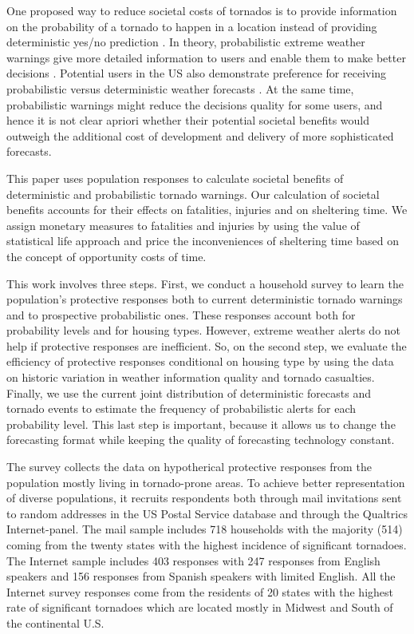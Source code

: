 \documentclass{ametsocV6.1}
\begin{document}
One proposed way to reduce societal costs of tornados is to provide information on the probability of a tornado to happen in a location instead of providing deterministic yes/no prediction \citep{rothfusz_facets_2018}. In theory, probabilistic extreme weather warnings give more detailed information to users and enable them to make better decisions \citep{murphy_what_1993, papastavrou_improving_1996}.  Potential users in the US also demonstrate preference for receiving probabilistic versus deterministic weather forecasts \citep*{morss_communicating_2008, morss_examining_2010}. At the same time, probabilistic warnings might reduce the decisions quality for some users, and hence it is not clear apriori whether their potential societal benefits would outweigh the additional cost of development and delivery of more sophisticated forecasts.

This paper uses population responses to calculate societal benefits of deterministic and probabilistic tornado warnings. Our calculation of societal benefits accounts for their effects on fatalities, injuries and on sheltering time. We assign monetary measures to fatalities and injuries by using the value of statistical life approach and price the inconveniences of sheltering time based on the concept of opportunity costs of time.

This work involves three steps. First, we conduct a household survey to learn the population's protective responses both to current deterministic tornado warnings and to prospective probabilistic ones. These responses account both for probability levels and for housing types. However, extreme weather alerts do not help if protective responses are inefficient. So, on the second step, we evaluate the efficiency of protective responses conditional on housing type by using the data on historic variation in weather information quality and tornado casualties. Finally, we use the current joint distribution of deterministic forecasts and tornado events to estimate the frequency of probabilistic alerts for each probability level. This last step is important, because it allows us to change the forecasting format while keeping the quality of forecasting technology constant.

The survey collects the data on hypotherical protective responses from the population mostly living in tornado-prone areas. To achieve better representation of diverse populations, it recruits respondents both through mail invitations sent to random addresses in the US Postal Service database and through the Qualtrics Internet-panel. The mail sample includes 718 households with the majority (514) coming from the twenty states with the highest incidence of significant tornadoes. The Internet sample includes 403 responses with 247 responses from English speakers and 156 responses from Spanish speakers with limited English. All the Internet survey responses come from the residents of 20 states with the highest rate of significant tornadoes which are located mostly in Midwest and South of the continental U.S. 
\end{document}
